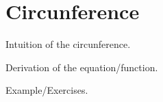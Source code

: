 \documentclass[../main-notes.tex]{subfiles}
\begin{document}
\section{Circunference}

Intuition of the circunference.

Derivation of the equation/function.

Example/Exercises.
\end{document}
